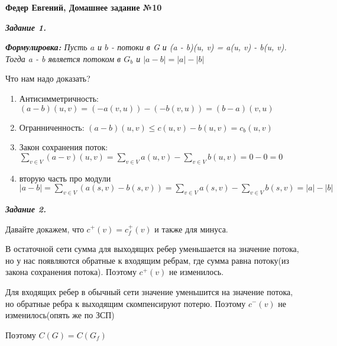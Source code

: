 \documentclass[12pt, a4paper]{scrartcl}
\begin{document}
	\LARGE{\textbf{Федер Евгений, Домашнее задание №10}}\par
	
	\emph{\textbf{Задание 1.}}\par
	\textit{\textbf{Формулировка:} Пусть $a$ и $b$ - потоки в G и (a - b)(u, v) = a(u, v) - b(u, v). Тогда a - b является потоком в $G_b$ и $|a-b|=|a|-|b|$}\par
	
	Что нам надо доказать?\par
	\begin{enumerate}
		\item Антисимметричность: $(a - b)(u, v) = (-a(v, u)) - (-b(v, u)) = (b - a)(v, u)$
		\item Огранниченность: $(a - b)(u, v) \leqslant c(u, v) - b(u, v) = c_b(u, v)$
		\item Закон сохранения поток: $\sum_{v \in V}(a - v)(u, v) = \sum_{v \in V}a(u, v) - \sum_{v \in V}b(u, v) = 0 - 0 = 0$
		\item вторую часть про модули $ |a - b| = \sum_{v \in V}(a(s,v) - b(s,v)) = \sum_{v \in V}a(s,v) - \sum_{v \in V}b(s,v) = |a| - |b|$ 	
	\end{enumerate}

	\emph{\textbf{Задание 2.}}\par
	Давайте докажем, что $c^+(v) = c_f^+(v)$ и также для минуса.\par
	В остаточной сети сумма для выходящих ребер уменьшается на значение потока, но у нас появляются обратные к входящим ребрам, где сумма равна потоку(из закона сохранения потока). Поэтому $c^+(v)$ не изменилось.\par
	Для входящих ребер в обычный сети значение уменьшится на значение потока, но обратные ребра к выходящим скомпенсируют потерю. Поэтому $c^-(v)$ не изменилось(опять же по ЗСП)\par
	Поэтому $C(G) = C(G_f)$
	
\end{document}
